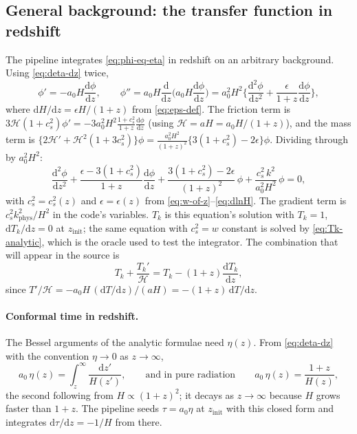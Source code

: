 \documentclass[11pt,a4paper]{article}
\newcommand{\cH}{\mathcal{H}}
\newcommand{\dd}{\mathrm{d}}
\newcommand{\zinit}{z_{\mathrm{init}}}
\newcommand{\eps}{\epsilon}
\newcommand{\kphys}{k_{\mathrm{phys}}}
\theoremstyle{remark}
\begin{document}
\subsection{General background: the transfer function in redshift}
\label{sec:Tk-redshift}

The pipeline integrates \eqref{eq:phi-eq-eta} in redshift on an arbitrary background. Using \eqref{eq:deta-dz} twice,
\begin{equation}
\phi' = -a_0H\frac{\dd\phi}{\dd z},\qquad
\phi'' = a_0H\frac{\dd}{\dd z}\Big(a_0H\frac{\dd\phi}{\dd z}\Big) = a_0^2H^2\Big\{\frac{\dd^2\phi}{\dd z^2} + \frac{\eps}{1+z}\frac{\dd\phi}{\dd z}\Big\},
\label{eq:second-derivative-z}
\end{equation}
where $\dd H/\dd z = \eps H/(1+z)$ from \eqref{eq:eps-def}. The friction term is $3\cH(1+c_s^2)\phi' = -3a_0^2H^2\frac{1+c_s^2}{1+z}\frac{\dd\phi}{\dd z}$ (using $\cH = aH = a_0H/(1+z)$), and the mass term is $\big\{2\cH'+\cH^2(1+3c_s^2)\big\}\phi = \frac{a_0^2H^2}{(1+z)^2}\big\{3(1+c_s^2)-2\eps\big\}\phi$. Dividing through by $a_0^2H^2$:
\begin{equation}
\boxed{\;
\frac{\dd^2\phi}{\dd z^2} + \frac{\eps-3(1+c_s^2)}{1+z}\frac{\dd\phi}{\dd z}
+ \frac{3(1+c_s^2)-2\eps}{(1+z)^2}\,\phi + \frac{c_s^2\,k^2}{a_0^2H^2}\,\phi = 0 ,\;}
\label{eq:Tk-redshift}
\end{equation}
with $c_s^2 = c_s^2(z)$ and $\eps = \eps(z)$ from \eqref{eq:w-of-z}--\eqref{eq:dlnH}. The gradient term is $c_s^2\kphys^2/H^2$ in the code's variables. $T_k$ is this equation's solution with $T_k = 1$, $\dd T_k/\dd z = 0$ at $\zinit$; the same equation with $c_s^2 = w$ constant is solved by \eqref{eq:Tk-analytic}, which is the oracle used to test the integrator. The combination that will appear in the source is
\begin{equation}
T_k + \frac{T_k'}{\cH} = T_k - (1+z)\frac{\dd T_k}{\dd z},
\label{eq:T-plus-Tprime}
\end{equation}
since $T'/\cH = -a_0H\,(\dd T/\dd z)/(aH) = -(1+z)\,\dd T/\dd z$.

\paragraph{Conformal time in redshift.} The Bessel arguments of the analytic formulae need $\eta(z)$. From \eqref{eq:deta-dz} with the convention $\eta\to0$ as $z\to\infty$,
\begin{equation}
a_0\,\eta(z) = \int_z^\infty\frac{\dd z'}{H(z')} ,
\qquad\text{and in pure radiation}\qquad a_0\,\eta(z) = \frac{1+z}{H(z)} ,
\label{eq:tau-of-z}
\end{equation}
the second following from $H\propto(1+z)^2$; it decays as $z\to\infty$ because $H$ grows faster than $1+z$. The pipeline seeds $\tau = a_0\eta$ at $\zinit$ with this closed form and integrates $\dd\tau/\dd z = -1/H$ from there.
\end{document}

